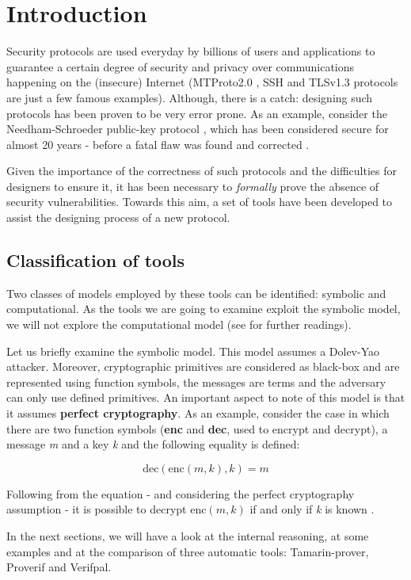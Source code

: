 
\section{Introduction}
\label{section:introduction}

Security protocols are used everyday by billions of users and applications to guarantee a certain degree of security and privacy over communications happening on the (insecure) Internet (MTProto2.0 \cite{Telegram-MTProto2.0}, SSH \cite{rfc4251} and TLSv1.3 \cite{TLSv1.3_specs} protocols are just a few famous examples). Although, there is a catch: designing such protocols has been proven to be very error prone. As an example, consider the Needham-Schroeder public-key protocol \cite{NSPK}, which has been considered secure for almost 20 years - before a fatal flaw was found and corrected \cite{NSPK_LoweGavin}.

Given the importance of the correctness of such protocols and the difficulties for designers to ensure it, it has been necessary to \textit{formally} prove the absence of security vulnerabilities. Towards this aim, a set of tools have been developed to assist the designing process of a new protocol.

\subsection{Classification of tools}

Two classes of models employed by these tools can be identified: symbolic and computational. As the tools we are going to examine exploit the symbolic model, we will not explore the computational model (see \cite{ReconcilingComputationalSymbolic, SymbolicComputationalBlanchet, 10.1007/978-3-540-31987-0_12} for further readings). 

Let us briefly examine the symbolic model. This model assumes a Dolev-Yao \cite{Dolev-Yao} attacker. Moreover, cryptographic primitives are considered as black-box and are represented using function symbols, the messages are terms and the adversary can only use defined primitives. An important aspect to note of this model is that it assumes \textbf{perfect cryptography}. As an example, consider the case in which there are two function symbols (\textbf{enc} and \textbf{dec}, used to encrypt and decrypt), a message \textit{m} and a key \textit{k} and the following equality is defined:

\begin{equation}
\mbox{dec}\left(\mbox{enc}\left(m, k\right), k\right) = m
\end{equation}

Following from the equation - and considering the perfect cryptography assumption - it is possible to decrypt $\mbox{enc}\left(m, k\right)$ if and only if \textit{k} is known \cite{SymbolicComputationalBlanchet}.

In the next sections, we will have a look at the internal reasoning, at some examples and at the comparison of three automatic tools: Tamarin-prover, Proverif and Verifpal.